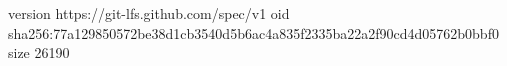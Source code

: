 version https://git-lfs.github.com/spec/v1
oid sha256:77a129850572be38d1cb3540d5b6ac4a835f2335ba22a2f90cd4d05762b0bbf0
size 26190
